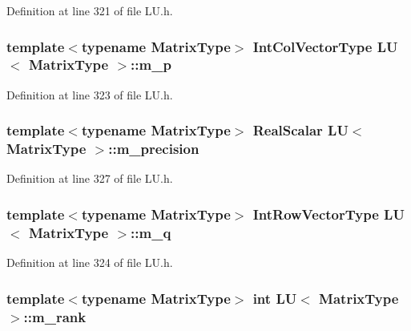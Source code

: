 Definition at line 321 of file L\-U.\-h.

\hypertarget{class_l_u_a7666f778da10e87f96aa8a3c19b7a112}{
\subsubsection[{m\-\_\-p}]{\setlength{\rightskip}{0pt plus 5cm}template$<$typename Matrix\-Type$>$ {\bf Int\-Col\-Vector\-Type} {\bf L\-U}$<$ Matrix\-Type $>$\-::m\-\_\-p\hspace{0.3cm}{\ttfamily [protected]}}}\label{class_l_u_a7666f778da10e87f96aa8a3c19b7a112}


Definition at line 323 of file L\-U.\-h.

\hypertarget{class_l_u_a2166ed8c8e8764d0ca86dca4518eadba}{
\subsubsection[{m\-\_\-precision}]{\setlength{\rightskip}{0pt plus 5cm}template$<$typename Matrix\-Type$>$ {\bf Real\-Scalar} {\bf L\-U}$<$ Matrix\-Type $>$\-::m\-\_\-precision\hspace{0.3cm}{\ttfamily [protected]}}}\label{class_l_u_a2166ed8c8e8764d0ca86dca4518eadba}


Definition at line 327 of file L\-U.\-h.

\hypertarget{class_l_u_a3613b350d88bbf92f783cf0db45366f9}{
\subsubsection[{m\-\_\-q}]{\setlength{\rightskip}{0pt plus 5cm}template$<$typename Matrix\-Type$>$ {\bf Int\-Row\-Vector\-Type} {\bf L\-U}$<$ Matrix\-Type $>$\-::m\-\_\-q\hspace{0.3cm}{\ttfamily [protected]}}}\label{class_l_u_a3613b350d88bbf92f783cf0db45366f9}


Definition at line 324 of file L\-U.\-h.

\hypertarget{class_l_u_a6fce66346164396520654fc54d25c54a}{
\subsubsection[{m\-\_\-rank}]{\setlength{\rightskip}{0pt plus 5cm}template$<$typename Matrix\-Type$>$ {\bf int} {\bf L\-U}$<$ Matrix\-Type $>$\-::m\-\_\-rank\hspace{0.3cm}{\ttfamily [protected]}}}\label{class_l_u_a6fce66346164396520654fc54d25c54a}


